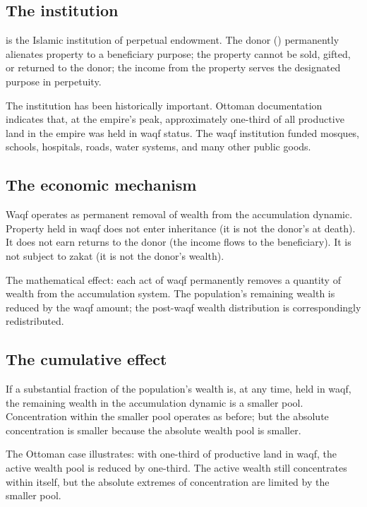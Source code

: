 \subsection{The institution}

 is the Islamic institution of perpetual endowment. The
donor () permanently alienates property to a beneficiary
purpose; the property cannot be sold, gifted, or returned to the
donor; the income from the property serves the designated purpose
in perpetuity.

The institution has been historically important. Ottoman
documentation indicates that, at the empire's peak, approximately
one-third of all productive land in the empire was held in waqf
status. The waqf institution funded mosques, schools, hospitals,
roads, water systems, and many other public goods.

\subsection{The economic mechanism}

Waqf operates as permanent removal of wealth from the
accumulation dynamic. Property held in waqf does not enter
inheritance (it is not the donor's at death). It does not earn
returns to the donor (the income flows to the beneficiary). It is
not subject to zakat (it is not the donor's wealth).

The mathematical effect: each act of waqf permanently removes a
quantity of wealth from the accumulation system. The population's
remaining wealth is reduced by the waqf amount; the
post-waqf wealth distribution is correspondingly redistributed.

\subsection{The cumulative effect}

If a substantial fraction of the population's wealth is, at any
time, held in waqf, the remaining wealth in the accumulation
dynamic is a smaller pool. Concentration within the smaller pool
operates as before; but the absolute concentration is smaller
because the absolute wealth pool is smaller.

The Ottoman case illustrates: with one-third of productive land in
waqf, the active wealth pool is reduced by one-third. The active
wealth still concentrates within itself, but the absolute extremes
of concentration are limited by the smaller pool.

